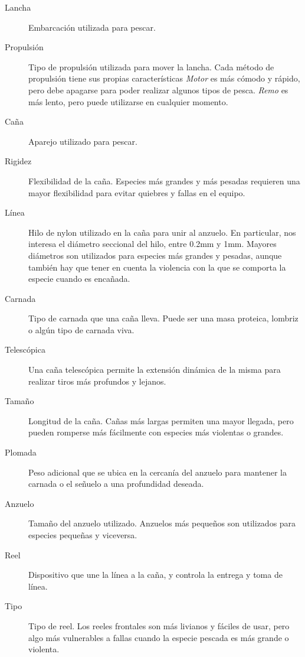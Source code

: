 \documentclass[a4paper,11pt]{article}
\begin{document}
\begin{description}
  \item[Lancha] Embarcación utilizada para pescar.

  \item[Propulsión] Tipo de propulsión utilizada para mover la lancha. Cada
    método de propulsión tiene sus propias características \emph{Motor} es más
    cómodo y rápido, pero debe apagarse para poder realizar algunos tipos de
    pesca. \emph{Remo} es más lento, pero puede utilizarse en cualquier
    momento.

  \item[Caña] Aparejo utilizado para pescar.

  \item[Rigidez] Flexibilidad de la caña. Especies más grandes y más pesadas
    requieren una mayor flexibilidad para evitar quiebres y fallas en el
    equipo.

  \item[Línea] Hilo de nylon utilizado en la caña para unir al anzuelo. En
    particular, nos interesa el diámetro seccional del hilo, entre 0.2mm y 1mm.
    Mayores diámetros son utilizados para especies más grandes y pesadas,
    aunque también hay que tener en cuenta la violencia con la que se comporta
    la especie cuando es encañada.

  \item[Carnada] Tipo de carnada que una caña lleva. Puede ser una masa
    proteica, lombriz o algún tipo de carnada viva.

  \item[Telescópica] Una caña telescópica permite la extensión dinámica de la
    misma para realizar tiros más profundos y lejanos.

  \item[Tamaño] Longitud de la caña. Cañas más largas permiten una mayor
    llegada, pero pueden romperse más fácilmente con especies más violentas o
    grandes.

  \item[Plomada] Peso adicional que se ubica en la cercanía del anzuelo para
    mantener la carnada o el señuelo a una profundidad deseada.

  \item[Anzuelo] Tamaño del anzuelo utilizado. Anzuelos más pequeños son
    utilizados para especies pequeñas y viceversa.

  \item[Reel] Dispositivo que une la línea a la caña, y controla la entrega y
    toma de línea.

  \item[Tipo] Tipo de reel. Los reeles frontales son más livianos y fáciles de
    usar, pero algo más vulnerables a fallas cuando la especie pescada es más
    grande o violenta.


\end{description}
\end{document}
